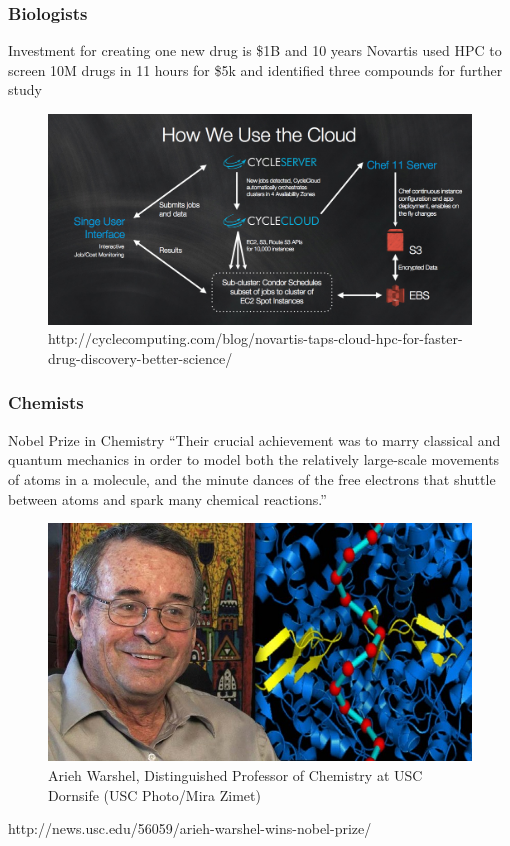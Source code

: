 \documentclass{beamer}
\begin{document}
\begin{frame}
  \frametitle{Biologists}
  \center Investment for creating one new drug is \$1B and 10 years 
  \center Novartis used HPC to screen 10M drugs in 11 hours for \$5k and 
          identified three compounds for further study
  \begin{figure} \centering
    \includegraphics[width=.8\textwidth]{figs/bio/drug-discovery.png}
    \caption{\tiny http://cyclecomputing.com/blog/novartis-taps-cloud-hpc-for-faster-drug-discovery-better-science/ }
  \end{figure}
\end{frame}

\begin{frame}
  \frametitle{Chemists}
   Nobel Prize in Chemistry
  \center ``Their crucial achievement was to marry classical and quantum
   mechanics in order to model both the relatively large-scale movements of atoms
   in a molecule, and the minute dances of the free electrons that shuttle between
   atoms and spark many chemical reactions.''
   \begin{figure} \centering 
     \includegraphics[width=.5\textwidth]{figs/chem/Warshel-2009-824x463.jpg}
     \caption{Arieh Warshel, Distinguished Professor of Chemistry at 
      USC Dornsife (USC Photo/Mira Zimet)}
   \end{figure}
   {\small http://news.usc.edu/56059/arieh-warshel-wins-nobel-prize/}
\end{frame}
\end{document}
